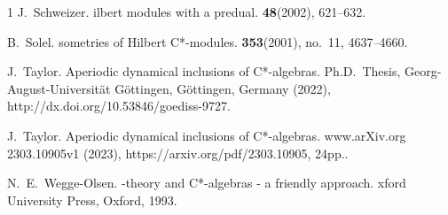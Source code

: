\documentclass{amsart}
\theoremstyle{definition}
\begin{document}
\begin{thebibliography}{1}
{\sc J.~Schweizer}.
ilbert modules with a predual.
 {\bf 48}(2002), 621--632.

{\sc B.~Solel}.
sometries of {H}ilbert {C}*-modules.
 {\bf 353}(2001), no.~11, 4637--4660.

{\sc J.~Taylor}.
\newblock Aperiodic dynamical inclusions of C*-algebras.
\newblock Ph.D.~Thesis, Georg-August-Universit\"at G\"ottingen, G\"ottingen, Germany (2022),
http://dx.doi.org/10.53846/goediss-9727.

{\sc J.~Taylor}.
\newblock Aperiodic dynamical inclusions of C*-algebras.
\newblock www.arXiv.org  2303.10905v1 (2023), https://arxiv.org/pdf/2303.10905, 24pp..

{\sc N.~E.~Wegge-Olsen}.
-theory and {C}*-algebras - a friendly approach.
xford {U}niversity {P}ress, {O}xford,  1993.

\end{thebibliography}
\end{document}
